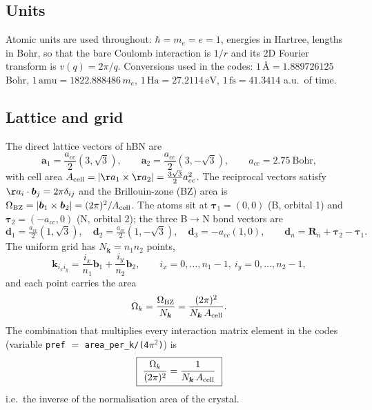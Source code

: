 \documentclass[11pt,a4paper]{article}
\newcommand{\kk}{\bm{k}}
\newcommand{\RR}{\bm{R}}
\newcommand{\dd}{\bm{d}}
\newcommand{\bb}{\bm{b}}
\newcommand{\aan}{\bm{a}}
\newcommand{\ttau}{\bm{\tau}}
\newcommand{\code}[1]{\texttt{#1}}
\newcommand{\Acell}{A_{\rm cell}}
\newcommand{\Nk}{N_{\bm k}}
\begin{document}
\subsection*{Units}
Atomic units are used throughout: $\hbar=m_e=e=1$, energies in Hartree, lengths in Bohr, so that the bare Coulomb interaction is $1/r$
and its 2D Fourier transform is $v(q)=2\pi/q$. Conversions used in the codes: $1\,\text{\AA}=1.889726125$ Bohr,
$1\,\text{amu}=1822.888486\,m_e$, $1\,\text{Ha}=27.2114\,\text{eV}$, $1\,\text{fs}=41.3414$ a.u.\ of time.

\subsection*{Lattice and grid}
The direct lattice vectors of hBN are
\begin{equation}
\aan_{1}=\frac{a_{cc}}{2}(3,\sqrt3),\qquad \aan_{2}=\frac{a_{cc}}{2}(3,-\sqrt3),\qquad a_{cc}=2.75\ \text{Bohr},
\end{equation}
with cell area $\Acell=|\aa_1\times\aa_2|=\tfrac{3\sqrt3}{2}a_{cc}^2$. The reciprocal vectors satisfy $\aa_i\cdot\bb_j=2\pi\delta_{ij}$
and the Brillouin-zone (BZ) area is $\Omega_{\rm BZ}=|\bb_1\times\bb_2|=(2\pi)^2/\Acell$.
The atoms sit at $\ttau_1=(0,0)$ (B, orbital 1) and $\ttau_2=(-a_{cc},0)$ (N, orbital 2); the three B$\to$N bond vectors are
\begin{equation}
\dd_1=\tfrac{a_{cc}}{2}(1,\sqrt3),\quad \dd_2=\tfrac{a_{cc}}{2}(1,-\sqrt3),\quad \dd_3=-a_{cc}(1,0),
\qquad \dd_n=\RR_n+\ttau_2-\ttau_1 .
\label{eq:bonds}
\end{equation}
The uniform grid has $\Nk=n_1n_2$ points,
\begin{equation}
\kk_{i_xi_y}=\frac{i_x}{n_1}\bb_1+\frac{i_y}{n_2}\bb_2,\qquad i_x=0,\dots,n_1-1,\ i_y=0,\dots,n_2-1,
\end{equation}
and each point carries the area
\begin{equation}
\Omega_k=\frac{\Omega_{\rm BZ}}{\Nk}=\frac{(2\pi)^2}{\Nk\,\Acell}.
\label{eq:areak}
\end{equation}
The combination that multiplies every interaction matrix element in the codes (variable \code{pref} $=$ \code{area\_per\_k/(4$\pi^2$)}) is
\begin{equation}
\boxed{\ \frac{\Omega_k}{(2\pi)^2}=\frac{1}{\Nk\,\Acell}\ }
\label{eq:pref}
\end{equation}
i.e.\ the inverse of the normalisation area of the crystal.

\end{document}
